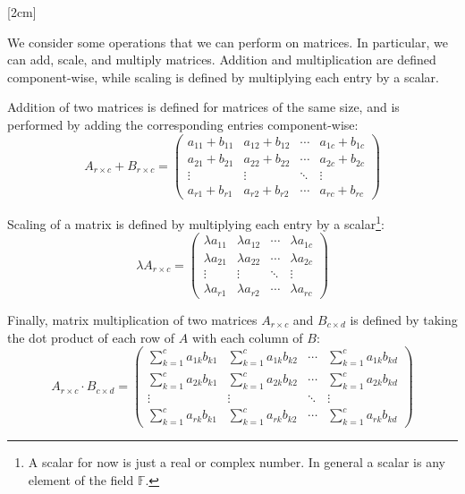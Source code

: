 {
[2cm]}

We consider some operations that we can perform on matrices. In particular, we can add, scale,
and multiply matrices. Addition and multiplication are defined component-wise, while scaling
is defined by multiplying each entry by a scalar.

Addition of two matrices is defined for matrices of the same size, and is performed by adding
the corresponding entries component-wise:
\begin{equation}
A_{r \times c} + B_{r \times c} = \begin{pmatrix}
    a_{11} + b_{11} & a_{12} + b_{12} & \cdots & a_{1c} + b_{1c} \\
    a_{21} + b_{21} & a_{22} + b_{22} & \cdots & a_{2c} + b_{2c} \\
    \vdots & \vdots & \ddots & \vdots \\
    a_{r1} + b_{r1} & a_{r2} + b_{r2} & \cdots & a_{rc} + b_{rc}
\end{pmatrix}
\end{equation}


Scaling of a matrix is defined by multiplying each entry by a scalar\footnote{A scalar
for now is just a real or complex number. In general a scalar is any element of the field
$\mathbb{F}$.}:
\begin{equation}
\lambda A_{r \times c} = \begin{pmatrix}
    \lambda a_{11} & \lambda a_{12} & \cdots & \lambda a_{1c} \\
    \lambda a_{21} & \lambda a_{22} & \cdots & \lambda a_{2c} \\
    \vdots & \vdots & \ddots & \vdots \\
    \lambda a_{r1} & \lambda a_{r2} & \cdots & \lambda a_{rc}
\end{pmatrix}
\end{equation}

Finally, matrix multiplication of two matrices $A_{r \times c}$ and $B_{c \times d}$ is defined
by taking the dot product of each row of $A$ with each column of $B$:
\begin{equation}
A_{r \times c} \cdot B_{c \times d} = \begin{pmatrix}
    \sum_{k=1}^{c} a_{1k} b_{k1} & \sum_{k=1}^{c} a_{1k} b_{k2} & \cdots & \sum_{k=1}^{c} a_{1k} b_{kd} \\
    \sum_{k=1}^{c} a_{2k} b_{k1} & \sum_{k=1}^{c} a_{2k} b_{k2} & \cdots & \sum_{k=1}^{c} a_{2k} b_{kd} \\
    \vdots & \vdots & \ddots & \vdots \\
    \sum_{k=1}^{c} a_{rk} b_{k1} & \sum_{k=1}^{c} a_{rk} b_{k2} & \cdots & \sum_{k=1}^{c} a_{rk} b_{kd}
\end{pmatrix}
\label{eq:matrixmult}
\end{equation}

